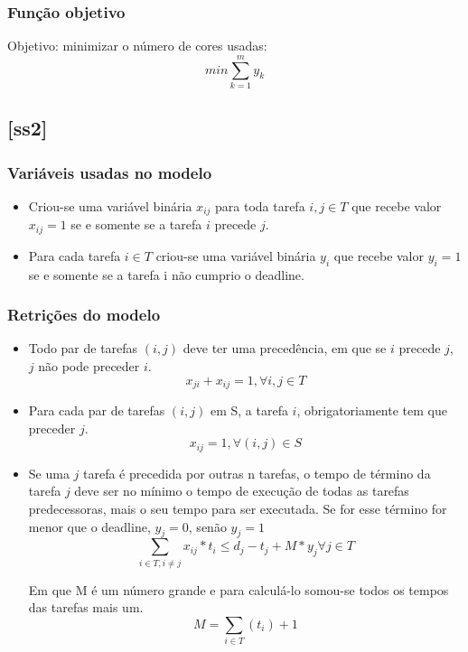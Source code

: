 \documentclass[11pt,letterpaper]{article}
\begin{document}
\subsubsection*{Função objetivo}
Objetivo: minimizar o número de cores usadas:
\begin{equation}
min\sum_{k=1}^{m}y_k
\end{equation}


\subsection{{[}ss2{]}}
\subsubsection*{Variáveis usadas no modelo}
\begin{itemize}
\item Criou-se uma variável binária $x_{ij}$ para toda tarefa $i, j
  \in T$ que recebe valor $x_{ij}=1$ se e somente se a
tarefa $i$ precede $j$.

\item Para cada tarefa $i \in T$ criou-se uma variável binária $y_{i}$
  que recebe valor $y_{i}=1$ se e somente se a tarefa i não cumprio o deadline.
\end{itemize}

\subsubsection*{Retrições do modelo}
\begin{itemize}

\item Todo par de tarefas $(i,j)$ deve ter uma precedência, em que se $i$
  precede $j$, $j$ não pode preceder $i$. 
\begin{equation*}
  x_{ji}+x_{ij}=1, \forall i,j \in T
\end{equation*}

\item Para cada par de tarefas $(i,j)$ em S, a tarefa $i$,
  obrigatoriamente tem que preceder $j$. 
\begin{equation*}
  x_{ij} = 1, \forall (i,j) \in S
\end{equation*}

\item Se uma $j$ tarefa é precedida por outras n tarefas, o tempo de
  término da tarefa $j$ deve ser no mínimo o tempo de execução de todas
  as tarefas predecessoras, mais o seu tempo para ser executada. Se
  for esse término for menor que o deadline, $y_{j}=0$, senão $y_{j}=1$ 
\begin{equation*}
 \sum_{i \in T, i \neq j} x_{ij}*t_{i} \leq d_{j}-t_{j}+ M*y_{j} \forall j \in T
\end{equation*}
 
Em que M é um número grande e para calculá-lo somou-se todos os tempos
das tarefas mais um. 
\begin{equation*}
 M = \sum_{i \in T} (t_{i}) +1
\end{equation*}
 
\end{itemize}
\end{document}
